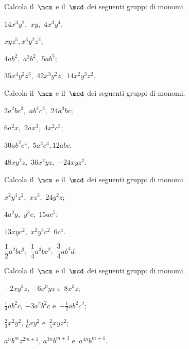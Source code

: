 \begin{esercizio}[\Ast]
 \label{ese:10.46} %
Calcola il~$\mcm$ e il~$\mcd$ dei seguenti gruppi di monomi.
\begin{multicols}{2}
\begin{enumeratea}
 \item $14x^{3}y^{2}$,\, $xy$,\, $4x^{3}y^{4}$;
 \item $xyz^{5}$,\,$x^{3}y^{2}z^{2}$;
 \item $4ab^{2}$,\, $a^{3}b^{2}$,\, $5ab^{5}$;
 \item $35x^4y^2z^3$,\, $42x^3y^2z$,\, $14x^2y^3z^2$.
\end{enumeratea}
\end{multicols}
\end{esercizio}

\begin{esercizio}
 \label{ese:10.47} %
Calcola il~$\mcm$ e il~$\mcd$ dei seguenti gruppi di monomi.
\begin{multicols}{2}
\begin{enumeratea}
 \item $2a^{2}bc^{3}$,\, $ab^{4}c^{2}$,\, $24a^{3}bc$;
 \item $6a^{2}x$,\, $2ax^{3}$,\, $4x^{2}c^{3}$;
 \item $30ab^{2}c^{4}$,\, $5a^{2}c^{3}$,\,$12abc$.
 \item $48xy^2z$,\, $36x^2yz$,\, $-24xyz^2$.
\end{enumeratea}
\end{multicols}
\end{esercizio}

\begin{esercizio}
 \label{ese:10.48} %
Calcola il~$\mcm$ e il~$\mcd$ dei seguenti gruppi di monomi.
\begin{multicols}{2}
\begin{enumeratea}
 \item $x^{2}y^{4}z^{2}$,\, $xz^{3}$,\, $24y^{2}z$;
 \item $4a^{2}y$,\, $y^{3}c$,\, $15ac^{5}$;
 \item $13xyc^{2}$,\, $x^{2}y^{3}c^{2}$\, $6c^{4}$.
 \item $\dfrac{1}{2}a^2bc^3$,\, $\dfrac{1}{4}a^{3}bc^{2}$,\, $\dfrac{3}{4}ab^4d$.
\end{enumeratea}
\end{multicols}
\end{esercizio}

\begin{esercizio}[\Ast]
 \label{ese:10.49} %
Calcola il~$\mcm$ e il~$\mcd$ dei seguenti gruppi di monomi.

\begin{enumeratea}
 \item $-2xy^{3}z$, $-6x^{3}yz$ e~$8x^{3}z$;
 \item $\frac{1}{4}ab^{2}c$, $-3a^{2}b^{2}c$ e~$-{\frac{1}{2}}ab^{2}c^{2}$;
 \item $\frac{2}{3}x^{2}y^{2}$, $\frac{1}{6}xy^{2}$ e~$\frac{2}{5}xyz^{2}$;
 \item $a^{n}b^{m}z^{2m+1}$, $a^{3n}b^{m+3}$ e~$a^{4n}b^{m+4}$.
\end{enumeratea}
\end{esercizio}

